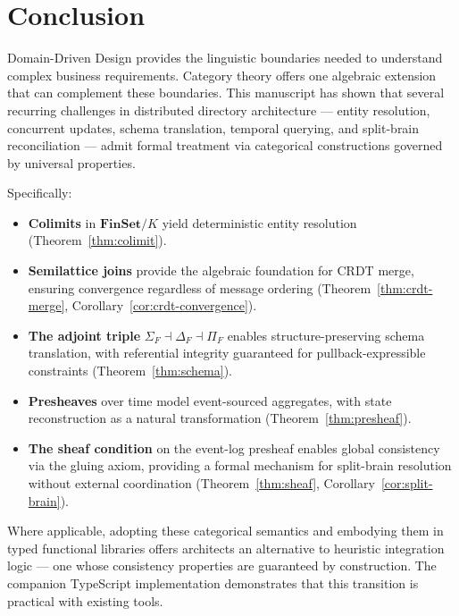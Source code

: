 \documentclass[11pt,a4paper]{article}
\begin{document}
\section{Conclusion}
\label{sec:conclusion}

Domain-Driven Design provides the linguistic boundaries needed to
understand complex business requirements. Category theory offers one algebraic
extension that can complement these boundaries. This manuscript has shown that several
recurring challenges in distributed directory architecture --- entity resolution, concurrent
updates, schema translation, temporal querying, and split-brain
reconciliation --- admit formal treatment via categorical constructions
governed by universal properties.

Specifically:
\begin{itemize}
  \item \textbf{Colimits} in $\mathbf{FinSet}/K$ yield deterministic
    entity resolution (Theorem~\ref{thm:colimit}).
  \item \textbf{Semilattice joins} provide the algebraic foundation
    for CRDT merge, ensuring convergence regardless of message ordering
    (Theorem~\ref{thm:crdt-merge}, Corollary~\ref{cor:crdt-convergence}).
  \item \textbf{The adjoint triple} $\Sigma_F\dashv\Delta_F\dashv\Pi_F$
    enables structure-preserving schema translation, with referential
    integrity guaranteed for pullback-expressible constraints
    (Theorem~\ref{thm:schema}).
  \item \textbf{Presheaves} over time model event-sourced aggregates,
    with state reconstruction as a natural transformation
    (Theorem~\ref{thm:presheaf}).
  \item \textbf{The sheaf condition} on the event-log presheaf enables
    global consistency via the gluing axiom, providing a formal mechanism
    for split-brain resolution without external coordination
    (Theorem~\ref{thm:sheaf}, Corollary~\ref{cor:split-brain}).
\end{itemize}

\noindent
Where applicable, adopting these categorical semantics and embodying them in typed
functional libraries offers architects an alternative to heuristic
integration logic --- one whose consistency properties
are guaranteed by construction. The companion TypeScript implementation
demonstrates that this transition is practical with existing tools.



\end{document}
